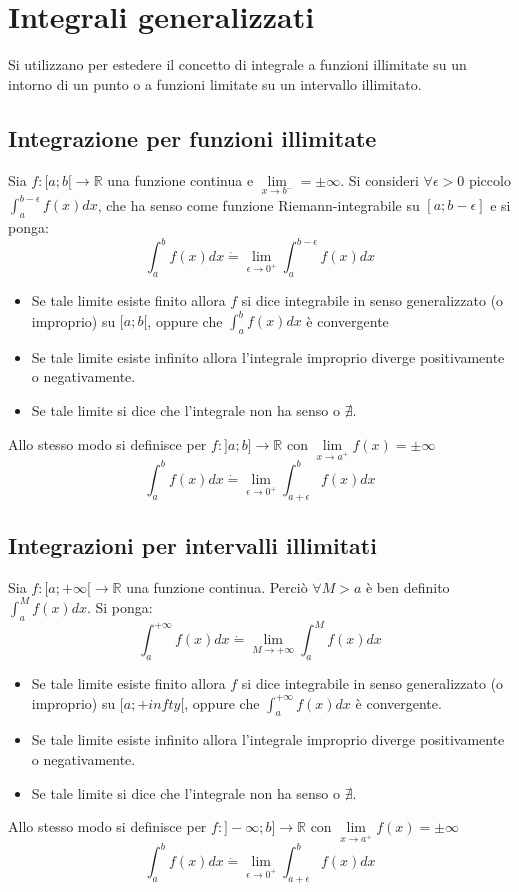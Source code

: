 \chapter{Integrali generalizzati}
Si utilizzano per estedere il concetto di integrale a funzioni illimitate su un intorno di un punto o a funzioni limitate su un intervallo illimitato.
\section{Integrazione per funzioni illimitate}
Sia $f:[a;b[\rightarrow\mathbb{R}$ una funzione continua e $\lim\limits_{x\rightarrow b^-}=\pm\infty$. Si consideri $\forall\epsilon>0$ piccolo $\int_a^{b-\epsilon}f(x)dx$, che ha 
senso come funzione Riemann-integrabile su $[a;b-\epsilon]$ e si ponga:
\begin{equation}
\int_a^bf(x)dx\dot{=}\lim\limits_{\epsilon\rightarrow0^+}\int_a^{b-\epsilon}f(x)dx
\end{equation}
\begin{itemize}
\item Se tale limite esiste finito allora $f$ si dice integrabile in senso generalizzato (o improprio) su $[a;b[$, oppure che $\int_a^bf(x)dx$ \`e convergente
\item Se tale limite esiste infinito allora l'integrale improprio diverge positivamente o negativamente.
\item Se tale limite si dice che l'integrale non ha senso o $\nexists$.
\end{itemize}
Allo stesso modo si definisce per $f:]a;b]\rightarrow\mathbb{R}$ con $\lim\limits_{x\rightarrow a^+}f(x)=\pm\infty$
\begin{equation}
\int_a^bf(x)dx\dot{=}\lim\limits_{\epsilon\rightarrow0^+}\int_{a+\epsilon}^bf(x)dx
\end{equation}
\section{Integrazioni per intervalli illimitati}
Sia $f:[a;+\infty[\rightarrow\mathbb{R}$ una funzione continua. Perci\`o $\forall M>a$ \`e ben definito $\int_a^Mf(x)dx$. Si ponga:
\begin{equation}
\int_a^{+\infty}f(x)dx\dot{=}\lim\limits_{M\rightarrow+\infty}\int_a^Mf(x)dx
\end{equation}
\begin{itemize}
\item Se tale limite esiste finito allora $f$ si dice integrabile in senso generalizzato (o improprio) su $[a;+infty[$, oppure che $\int_a^{+\infty}f(x)dx$ \`e convergente.
\item Se tale limite esiste infinito allora l'integrale improprio diverge positivamente o negativamente.
\item Se tale limite si dice che l'integrale non ha senso o $\nexists$.
\end{itemize}
Allo stesso modo si definisce per $f:]-\infty;b]\rightarrow\mathbb{R}$ con $\lim\limits_{x\rightarrow a^+}f(x)=\pm\infty$
\begin{equation}
\int_a^bf(x)dx\dot{=}\lim\limits_{\epsilon\rightarrow0^+}\int_{a+\epsilon}^bf(x)dx
\end{equation}
